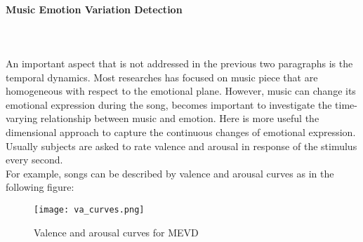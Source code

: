 \paragraph{Music Emotion Variation Detection}
\mbox{} \\ \\ \indent
An important aspect that is not addressed in the previous two paragraphs is the temporal dynamics. Most researches has focused on music piece that are homogeneous with respect to the emotional plane. However, music can change its emotional expression during the song, becomes important to investigate the time-varying relationship between music and emotion. Here is more useful the dimensional approach to capture the continuous changes of emotional expression. Usually subjects are asked to rate valence and arousal in response of the stimulus every second.
\\
For example, songs can be described by valence and arousal curves as in the following figure:
\begin{figure}[h]
    \centering
    \texttt{[image: va\_curves.png]} 
	\caption{Valence and arousal curves for MEVD}
    \label{fig:va_curves}
\end{figure}

